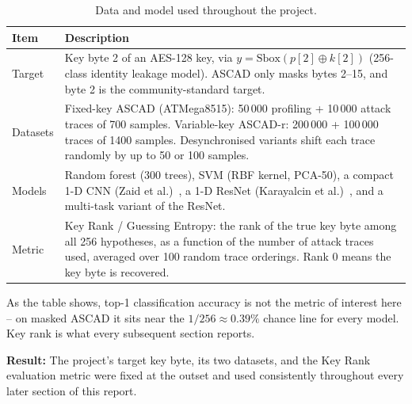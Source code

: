 \begin{table}[h]
\centering
\caption{Data and model used throughout the project.}
\label{tab:data-model}
\begin{tabular}{@{}p{3.2cm}p{10.5cm}@{}}
\toprule
Item & Description \\
\midrule
Target & Key byte 2 of an AES-128 key, via $y=\mathrm{Sbox}(p[2]\oplus k[2])$
         (256-class identity leakage model). ASCAD only masks bytes 2--15, and byte 2
         is the community-standard target. \\[4pt]
Datasets & Fixed-key ASCAD (ATMega8515): 50\,000 profiling + 10\,000 attack traces of
           700 samples. Variable-key ASCAD-r: 200\,000 + 100\,000 traces of 1400
           samples. Desynchronised variants shift each trace randomly by up to 50 or
           100 samples. \\[4pt]
Models & Random forest (300 trees), SVM (RBF kernel, PCA-50), a compact 1-D CNN
          (Zaid et al.)~\cite{zaid2020}, a 1-D ResNet (Karayalcin et
          al.)~\cite{karayalcin2023}, and a multi-task variant of the ResNet. \\[4pt]
Metric & Key Rank / Guessing Entropy: the rank of the true key byte among all 256
         hypotheses, as a function of the number of attack traces used, averaged over
         100 random trace orderings. Rank 0 means the key byte is recovered. \\
\bottomrule
\end{tabular}
\end{table}

As the table shows, top-1 classification accuracy is not the metric of interest here
-- on masked ASCAD it sits near the $1/256\approx0.39\%$ chance line for every model.
Key rank is what every subsequent section reports.

\textbf{Result:} The project's target key byte, its two datasets, and the Key Rank
evaluation metric were fixed at the outset and used consistently throughout every
later section of this report.
